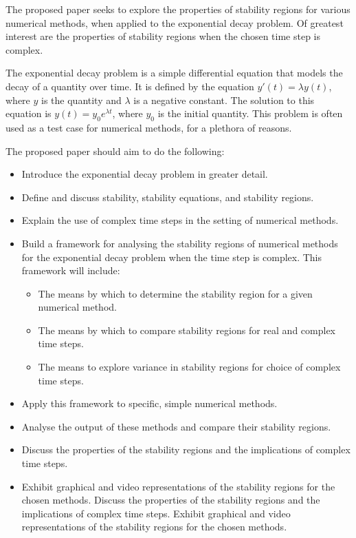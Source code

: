 \documentclass[a4paper, fleqn]{article}
\begin{document}
\par The proposed paper seeks to explore the properties of stability regions for various numerical methods, when applied to the exponential decay problem.
Of greatest interest are the properties of stability regions when the chosen time step is complex.\\

\par The exponential decay problem is a simple differential equation that models the decay of a quantity over time.
It is defined by the equation $y'(t) = \lambda y(t)$, where $y$ is the quantity and $\lambda$ is a negative constant.
The solution to this equation is $y(t) = y_0 e^{\lambda t}$, where $y_0$ is the initial quantity.
This problem is often used as a test case for numerical methods, for a plethora of reasons.\\

\par The proposed paper should aim to do the following:
\begin{itemize}
    \item Introduce the exponential decay problem in greater detail.
    \item Define and discuss stability, stability equations, and stability regions.
    \item Explain the use of complex time steps in the setting of numerical methods.
    \item Build a framework for analysing the stability regions of numerical methods for the exponential decay problem when the time step is complex. This framework will include:
    \begin{itemize}
	\item The means by which to determine the stability region for a given numerical method.
	\item The means by which to compare stability regions for real and complex time steps.
	\item The means to explore variance in stability regions for choice of complex time steps.
    \end{itemize}
    \item Apply this framework to specific, simple numerical methods.
    \item Analyse the output of these methods and compare their stability regions.
    \item Discuss the properties of the stability regions and the implications of complex time steps.
    \item Exhibit graphical and video representations of the stability regions for the chosen methods.
Discuss the properties of the stability regions and the implications of complex time steps.
Exhibit graphical and video representations of the stability regions for the chosen methods.
\end{itemize}
\end{document}
